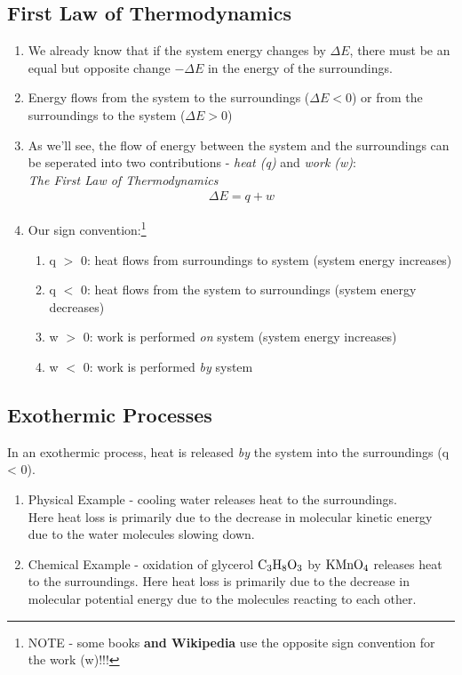 \documentclass[../CHEM152Notes.tex]{subfiles}
\begin{document}
\subsection*{First Law of Thermodynamics}
\begin{enumerate}
    \item We already know that if the system energy changes by $\Delta E$, there must be an equal but opposite change $-\Delta E$ in the energy of the surroundings.
    \item Energy flows from the system to the surroundings ($\Delta E < 0$) or from the surroundings to the system ($\Delta E > 0$)
    \item As we'll see, the flow of energy between the system and the surroundings can be seperated into two contributions - \emph{heat (q)} and \emph{work (w)}: \\
    \emph{The First Law of Thermodynamics}
        \begin{equation*}
            \begin{aligned}
                \Delta E = q + w 
            \end{aligned}
        \end{equation*}
    \item Our sign convention:\footnote{NOTE - some books \textbf{and Wikipedia} use the opposite sign convention for the work (w)!!!}
        \begin{enumerate}
            \item q $>$ 0: heat flows from surroundings to system (system energy increases) 
            \item q $<$ 0: heat flows from the system to surroundings (system energy decreases)
            \item w $>$ 0: work is performed \emph{on} system (system energy increases)
            \item w $<$ 0: work is performed \emph{by} system
        \end{enumerate}
\end{enumerate}

\subsection*{Exothermic Processes}
In an exothermic process, heat is released \emph{by} the system into the surroundings (q < 0).
\begin{enumerate}
    \item Physical Example - cooling water releases heat to the surroundings. \\
    Here heat loss is primarily due to the decrease in molecular kinetic energy due to the water molecules slowing down.
    \item Chemical Example - oxidation of glycerol $\ce{C3H8O3}$ by $\ce{KMnO4}$ releases heat to the surroundings.
    Here heat loss is primarily due to the decrease in molecular potential energy due to the molecules reacting to each other.
\end{enumerate}
\end{document}
